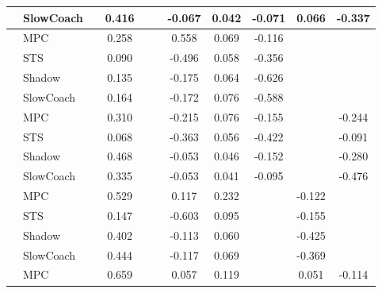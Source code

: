 \begin{tabular}{|l|l|*{9}{c|}}
                                                           & SlowCoach &       &     0.416 &        &     & -0.067 &  0.042 &  -0.071 &   0.066 &   -0.337 \\
\midrule
[False, True, False, False, True, True, True, False, False] & MPC &       &     0.258 &        &     &  0.558 &  0.069 &  -0.116 &      &       \\
                                                           & STS &       &     0.090 &        &     & -0.496 &  0.058 &  -0.356 &      &       \\
                                                           & Shadow &       &     0.135 &        &     & -0.175 &  0.064 &  -0.626 &      &       \\
                                                           & SlowCoach &       &     0.164 &        &     & -0.172 &  0.076 &  -0.588 &      &       \\
\midrule
[False, True, False, False, True, True, True, False, True] & MPC &       &     0.310 &        &     & -0.215 &  0.076 &  -0.155 &      &   -0.244 \\
                                                           & STS &       &     0.068 &        &     & -0.363 &  0.056 &  -0.422 &      &   -0.091 \\
                                                           & Shadow &       &     0.468 &        &     & -0.053 &  0.046 &  -0.152 &      &   -0.280 \\
                                                           & SlowCoach &       &     0.335 &        &     & -0.053 &  0.041 &  -0.095 &      &   -0.476 \\
\midrule
[False, True, False, False, True, True, False, True, False] & MPC &       &     0.529 &        &     &  0.117 &  0.232 &      &  -0.122 &       \\
                                                           & STS &       &     0.147 &        &     & -0.603 &  0.095 &      &  -0.155 &       \\
                                                           & Shadow &       &     0.402 &        &     & -0.113 &  0.060 &      &  -0.425 &       \\
                                                           & SlowCoach &       &     0.444 &        &     & -0.117 &  0.069 &      &  -0.369 &       \\
\midrule
[False, True, False, False, True, True, False, True, True] & MPC &       &     0.659 &        &     &  0.057 &  0.119 &      &   0.051 &   -0.114 \\

\end{tabular}
